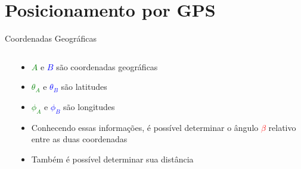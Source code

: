 \section{Posicionamento por GPS}

    \begin{frame}{Coordenadas Geográficas}
        \begin{columns}
            \begin{column}{0.55\textwidth}
                \centering
            \end{column}
            \begin{column}{0.45\textwidth}
                \begin{itemize}[<+(-3)->]
                    \item \textcolor{Green}{$A$} e \textcolor{Blue}{$B$} são coordenadas geográficas
                    \item \textcolor{Green}{$\theta_A$} e \textcolor{Blue}{$\theta_B$} são latitudes
                    \item \textcolor{Green}{$\phi_A$} e \textcolor{Blue}{$\phi_B$} são longitudes
                    \item Conhecendo essas informações, é possível determinar o ângulo \textcolor{Red}{$\beta$} relativo entre as duas coordenadas
                    \item Também é possível determinar sua distância
                \end{itemize}
            \end{column}
        \end{columns}
    \end{frame}


